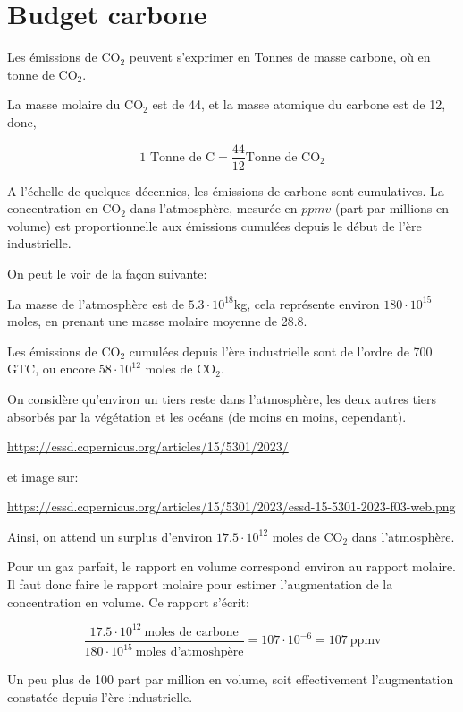 \section{Budget carbone}

Les émissions de CO$_2$ peuvent s'exprimer en Tonnes de masse carbone, où en tonne de CO$_2$. 

La masse molaire du CO$_2$ est de 44, et la masse atomique du  carbone est de 12, donc,

\begin{equation}
  \text{1 Tonne de C}=\frac{44}{12} \text{Tonne de CO$_2$}
\end{equation}

A l'échelle de quelques décennies, les émissions de carbone sont cumulatives. La concentration en CO$_2$ dans l'atmosphère, mesurée en $ppmv$ (part par millions en volume) est proportionnelle aux émissions cumulées depuis le début de l'ère industrielle. 

On peut le voir de la façon suivante: 

La masse de l'atmosphère est de $5.3 \cdot 10^{18}$kg, cela représente environ $180 \cdot 10^{15}$ moles, en prenant une masse molaire moyenne de 28.8. 


Les émissions de CO$_2$ cumulées depuis l'ère industrielle sont de l'ordre de 700 GTC, ou encore $58 \cdot 10^{12}$ moles de CO$_2$. 

On considère qu'environ un tiers reste dans l'atmosphère, les deux autres tiers absorbés par la végétation et les océans (de moins en moins, cependant). 

\url{https://essd.copernicus.org/articles/15/5301/2023/}

et image sur:

\url{https://essd.copernicus.org/articles/15/5301/2023/essd-15-5301-2023-f03-web.png}

Ainsi, on attend un surplus d'environ $17.5 \cdot 10^{12}$ moles de CO$_2$ dans l'atmosphère.

Pour un gaz parfait, le rapport en volume correspond environ au rapport molaire. Il faut donc faire le rapport molaire pour estimer l'augmentation de la concentration en volume.  Ce rapport s'écrit: 

\begin{equation*}
  \frac{17.5\cdot 10^{12}  \ \text{moles de carbone}}{180 \cdot 10^{15} \  \text{moles d'atmoshpère}} = 107 \cdot 10^{-6} = 107 \ \text{ppmv}
\end{equation*}

Un peu plus de 100 part par million en volume, soit effectivement l'augmentation constatée depuis l'ère industrielle. 

